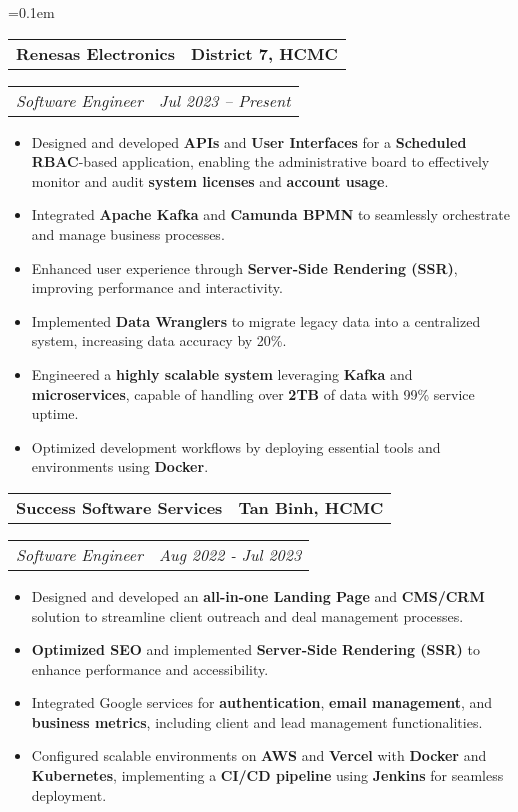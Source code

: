 \documentclass[11pt,letterpaper]{article}
\makeatletter
\newcommand{\headerrow}[2]
{\begin{tabular*}{\linewidth}{l@{\extracolsep{\fill}}r}
#1 &
#2 \\
\end{tabular*}}
\makeatother
\begin{document}
\parskip=0.1em
\headerrow
{\large\textbf{Renesas Electronics}}
{\textbf{District 7, HCMC}}
\headerrow
{\emph{Software Engineer}}
{\emph{Jul 2023 -- Present}}
\begin{itemize}[leftmargin=1em,noitemsep]
    \item Designed and developed \textbf{APIs} and \textbf{User Interfaces} for a \textbf{Scheduled RBAC}-based application, enabling the administrative board to effectively monitor and audit \textbf{system licenses} and \textbf{account usage}.
    \item Integrated \textbf{Apache Kafka} and \textbf{Camunda BPMN} to seamlessly orchestrate and manage business processes.
    \item Enhanced user experience through \textbf{Server-Side Rendering (SSR)}, improving performance and interactivity.
    \item Implemented \textbf{Data Wranglers} to migrate legacy data into a centralized system, increasing data accuracy by 20\%.
    \item Engineered a \textbf{highly scalable system} leveraging \textbf{Kafka} and \textbf{microservices}, capable of handling over \textbf{2TB} of data with 99\% service uptime.
    \item Optimized development workflows by deploying essential tools and environments using \textbf{Docker}.

\end{itemize}
\headerrow
{\large\textbf{Success Software Services}}
{\textbf{Tan Binh, HCMC}}
\headerrow
{\emph{Software Engineer}}
{\emph{Aug 2022 - Jul 2023}}
\begin{itemize}[leftmargin=1em,noitemsep]
    \item Designed and developed an \textbf{all-in-one Landing Page} and \textbf{CMS/CRM} solution to streamline client outreach and deal management processes.
    \item \textbf{Optimized SEO} and implemented \textbf{Server-Side Rendering (SSR)} to enhance performance and accessibility.
    \item Integrated Google services for \textbf{authentication}, \textbf{email management}, and \textbf{business metrics}, including client and lead management functionalities.
    \item Configured scalable environments on \textbf{AWS} and \textbf{Vercel} with \textbf{Docker} and \textbf{Kubernetes}, implementing a \textbf{CI/CD pipeline} using \textbf{Jenkins} for seamless deployment.

\end{itemize}
\end{document}
